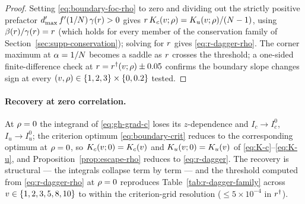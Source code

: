 \begin{proof}
Setting \eqref{eq:boundary-foc-rho} to zero and dividing out the
strictly positive prefactor
$d'_{\max}\, f'(1/N)\,\gamma(r) > 0$ gives
$r\, K_c(v; \rho) = K_u(v; \rho)/(N - 1)$, using
$\beta(r)/\gamma(r) = r$ (which holds for every member
of the conservation family of Section~\ref{sec:supp-conservation});
solving for $r$ gives \eqref{eq:r-dagger-rho}. The corner maximum at
$\alpha = 1/N$ becomes a saddle as $r$ crosses the threshold; a
one-sided finite-difference check at
$r = r^{\dagger}(v; \rho) \pm 0.05$ confirms the boundary slope
changes sign at every $(v, \rho) \in \{1, 2, 3\} \times \{0, 0.2\}$
tested.
\end{proof}

\paragraph{Recovery at zero correlation.}
At $\rho = 0$ the integrand of \eqref{eq:gh-grad-c} loses its
$z$-dependence and $I_c \to I_c^0$, $I_u \to I_u^0$; the criterion
optimum \eqref{eq:boundary-crit} reduces to the corresponding optimum at
$\rho = 0$, so $K_c(v; 0) = K_c(v)$ and $K_u(v; 0) = K_u(v)$
of \eqref{eq:K-c}--\eqref{eq:K-u}, and
Proposition~\ref{prop:escape-rho} reduces to \eqref{eq:r-dagger}. The
recovery is structural — the integrals collapse term by term — and the
threshold computed from \eqref{eq:r-dagger-rho} at $\rho = 0$
reproduces Table~\ref{tab:r-dagger-family} across $v \in \{1, 2, 3,
5, 8, 10\}$ to within the criterion-grid resolution
($\le 5 \times 10^{-4}$ in $r^{\dagger}$).


